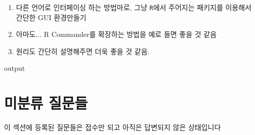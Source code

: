 \documentclass{report}
\begin{document}
\begin{enumerate}
	\item 다른 언어로 인터페이싱 하는 방법마로, 그냥 \texttt{R}에서 주어지는 패키지를 이용해서 간단한 GUI 환경만들기
	\item 아마도... R Commander를 확장하는 방법을 예로 들면 좋을 것 같음
	\item 원리도 간단히 설명해주면 더욱 좋을 것 같음. 
\end{enumerate}

\begin{Schunk}
\begin{Soutput}
output
\end{Soutput}
\end{Schunk}

%
%
%


\chapter{미분류 질문들}


이 섹션에 등록된 질문들은 접수만 되고 아직은 답변되지 않은 상태입니다



\end{document}
